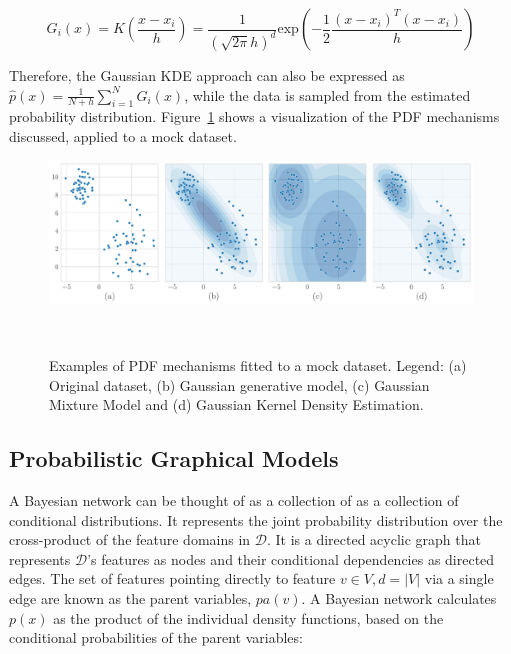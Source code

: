 \documentclass[parskip=full]{scrartcl}
\begin{document}
\begin{equation}
    G_i(x) = K\left(\frac{x-x_i}{h} \right) = \frac{1}{(\sqrt{2\pi} h)^d} 
    \text{exp}\left(-\frac{1}{2}\frac{(x-x_i)^T(x-x_i)}{h}\right) 
\end{equation}

Therefore, the Gaussian KDE approach can also be expressed as $\hat{p}(x) =
\frac{1}{N+h}\sum_{i=1}^{N}G_i(x)$, while the data is sampled from the
estimated probability distribution. Figure~\ref{fig:pdf-example} shows a
visualization of the PDF mechanisms discussed, applied to a mock dataset.

\begin{figure}
	\centering
	\includegraphics[width=1\linewidth]{../analysis/pdf-example}
    \caption{%
        Examples of PDF mechanisms fitted to a mock dataset. Legend: (a)
        Original dataset, (b) Gaussian generative model, (c) Gaussian Mixture
        Model and (d) Gaussian Kernel Density Estimation.
    }~\label{fig:pdf-example}
\end{figure}


\subsection{Probabilistic Graphical Models}

A Bayesian network can be thought of as a collection of as a collection of
conditional distributions. It represents the joint probability distribution
over the cross-product of the feature domains in $\mathcal{D}$. It is a
directed acyclic graph that represents $\mathcal{D}$'s features as nodes and
their conditional dependencies as directed edges. The set of features pointing
directly to feature $v \in V, d=|V|$ via a single edge are known as the parent
variables, $pa(v)$. A Bayesian network calculates $p(x)$ as the product of the
individual density functions, based on the conditional probabilities of the
parent variables:
\end{document}
